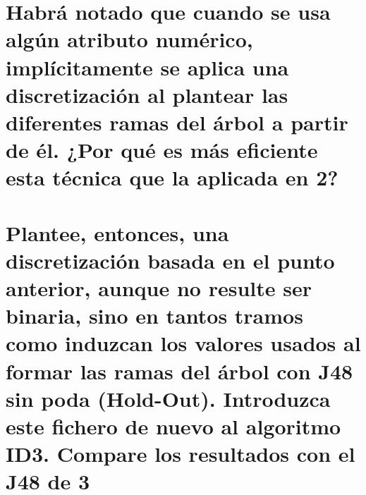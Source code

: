 \documentclass[10pt, a4paper,spanish]{article}
\begin{document}
	\section{Habrá notado que cuando se usa algún atributo numérico, implícitamente se aplica una discretización al plantear las diferentes ramas del árbol a partir de él. ¿Por qué es más eficiente esta técnica que la aplicada en 2?}

		\paragraph{}


	\section{Plantee, entonces, una discretización basada en el punto anterior, aunque no resulte ser binaria, sino en tantos tramos como induzcan los valores usados al formar las ramas del árbol con J48 sin poda (Hold-Out). Introduzca este fichero de nuevo al algoritmo ID3. Compare los resultados con el J48 de 3}

		\paragraph{}



	\nocite{subject:taa}
  
  
\end{document}

